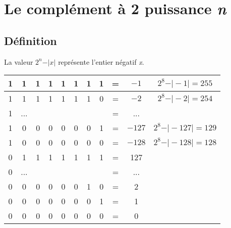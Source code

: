 \documentclass[a4paper,11pt]{article}
\begin{document}
\section{Le complément à 2 puissance \emph{n}}
\subsection{Définition}
La valeur $2^n - \vert x\vert$ représente l'entier négatif \emph{x}.
\begin{center}
    \begin{tabular}{|cccccccccc|c|}
        \hline
        1 & 1   & 1 & 1 & 1 & 1 & 1 & 1 & = & $-1$   & $2^8 - \vert -1\vert = 255$   \\
        \hline
        1 & 1   & 1 & 1 & 1 & 1 & 1 & 0 & = & $-2$   & $2^8 - \vert -2\vert = 254$   \\
        \hline
        1 & ... &   &   &   &   &   &   & = & ...    &                               \\
        \hline
        1 & 0   & 0 & 0 & 0 & 0 & 0 & 1 & = & $-127$ & $2^8 - \vert -127\vert = 129$ \\
        \hline
        1 & 0   & 0 & 0 & 0 & 0 & 0 & 0 & = & $-128$ & $2^8 - \vert -128\vert=128$   \\
        \hline
        0 & 1   & 1 & 1 & 1 & 1 & 1 & 1 & = & 127    &                               \\
        \hline
        0 & ... &   &   &   &   &   &   & = & ...    &                               \\
        \hline
        0 & 0   & 0 & 0 & 0 & 0 & 1 & 0 & = & 2      &                               \\
        \hline
        0 & 0   & 0 & 0 & 0 & 0 & 0 & 1 & = & 1      &                               \\
        \hline
        0 & 0   & 0 & 0 & 0 & 0 & 0 & 0 & = & 0      &                               \\
        \hline
    \end{tabular}
\end{center}
\end{document}
